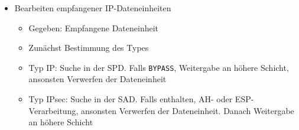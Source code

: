 \begin{itemize}
\begin{itemize}
\begin{itemize}
		\end{itemize}
		\item Bearbeiten empfangener IP-Dateneinheiten
		\begin{itemize}
			\item Gegeben: Empfangene Dateneinheit
			\item Zunächst Bestimmung des Types
			\item Typ IP: Suche in der SPD. Falls \texttt{BYPASS}, Weitergabe an höhere Schicht, ansonsten Verwerfen der Dateneinheit
			\item Typ IPsec: Suche in der SAD. Falls enthalten, AH- oder ESP-Verarbeitung, ansonsten Verwerfen der Dateneinheit. Danach Weitergabe an höhere Schicht
		\end{itemize}
	\end{itemize}
\end{itemize}


